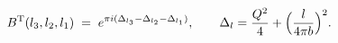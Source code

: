 \begin{equation}
B^{\rm T}(l_3,l_2,l_1)\;=\;
e^{\pi i(\Delta_{l_3}-\Delta_{l_2}-\Delta_{l_1})},
\qquad \Delta_l=\frac{Q^2}{4}
+\Bigl(\frac{l}{4\pi b}\Bigr)^2.
\end{equation}

